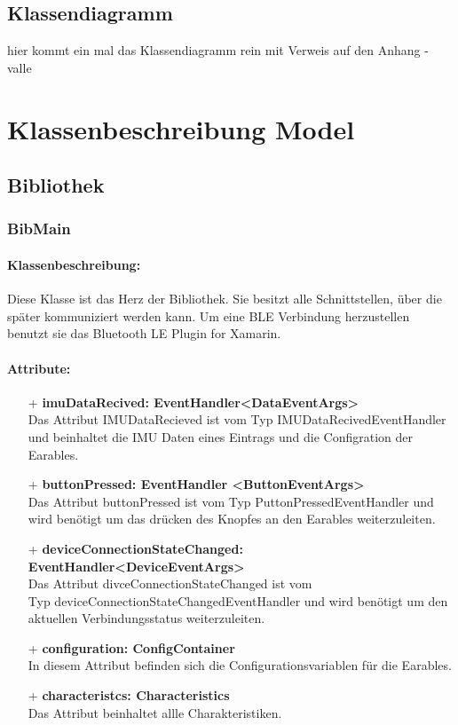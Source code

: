 \documentclass[a4paper,12pt]{article}
\begin{document}
  \subsection{Klassendiagramm}
hier kommt ein mal das Klassendiagramm rein mit Verweis auf den Anhang - valle
\clearpage
\section{Klassenbeschreibung Model}
\subsection{Bibliothek}
\subsubsection{BibMain}

\paragraph{Klassenbeschreibung:}
Diese Klasse ist das Herz der Bibliothek. Sie besitzt alle Schnittstellen, über die später kommuniziert werden kann. Um eine BLE Verbindung herzustellen benutzt sie das Bluetooth LE Plugin for Xamarin.

\paragraph{Attribute:}
\begin{itemize}
	\item[+] \textbf{imuDataRecived: EventHandler<DataEventArgs>}\\Das Attribut IMUDataRecieved ist vom Typ IMUDataRecivedEventHandler und beinhaltet die IMU Daten eines Eintrags und die Configration der Earables.
	\item[+] \textbf{buttonPressed: EventHandler <ButtonEventArgs>}\\ Das Attribut buttonPressed ist vom Typ PuttonPressedEventHandler und wird benötigt um das drücken des Knopfes an den Earables weiterzuleiten.
	\item[+] \textbf{deviceConnectionStateChanged: EventHandler<DeviceEventArgs>}\\ Das Attribut divceConnectionStateChanged ist vom \\Typ deviceConnectionStateChangedEventHandler und wird benötigt um den aktuellen Verbindungsstatus weiterzuleiten.
	\item[+] \textbf{configuration: ConfigContainer}\\ In diesem Attribut befinden sich die Configurationsvariablen für die Earables.
	\item[+] \textbf{characteristcs: Characteristics}\\ Das Attribut beinhaltet allle Charakteristiken.
\end{itemize}
\end{document}
